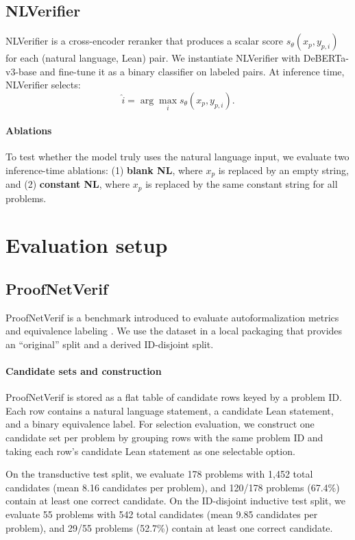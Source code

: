 \documentclass{article}
\begin{document}
\subsection{NLVerifier}
NLVerifier is a cross-encoder reranker \citep{nogueira2019passage} that produces a scalar score $s_\theta(x_p, y_{p,i})$ for each (natural language, Lean) pair.
We instantiate NLVerifier with DeBERTa-v3-base \citep{he2021debertav3} and fine-tune it as a binary classifier on labeled pairs.
At inference time, NLVerifier selects:
\[
\hat{i} = \arg\max_i s_\theta(x_p, y_{p,i}).
\]

\paragraph{Ablations}
To test whether the model truly uses the natural language input, we evaluate two inference-time ablations:
(1) \textbf{blank NL}, where $x_p$ is replaced by an empty string, and
(2) \textbf{constant NL}, where $x_p$ is replaced by the same constant string for all problems.

\section{Evaluation setup}

\subsection{ProofNetVerif}
ProofNetVerif is a benchmark introduced to evaluate autoformalization metrics and equivalence labeling \citep{poiroux2025reliable,proofnetverif_hf}.
We use the dataset in a local packaging that provides an ``original'' split and a derived ID-disjoint split.

\paragraph{Candidate sets and construction}
ProofNetVerif is stored as a flat table of candidate rows keyed by a problem ID.
Each row contains a natural language statement, a candidate Lean statement, and a binary equivalence label.
For selection evaluation, we construct one candidate set per problem by grouping rows with the same problem ID and taking each row's candidate Lean statement as one selectable option.

On the transductive test split, we evaluate 178 problems with 1{,}452 total candidates (mean 8.16 candidates per problem), and 120/178 problems (67.4\%) contain at least one correct candidate.
On the ID-disjoint inductive test split, we evaluate 55 problems with 542 total candidates (mean 9.85 candidates per problem), and 29/55 problems (52.7\%) contain at least one correct candidate.
\end{document}
